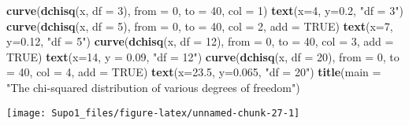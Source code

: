 \documentclass[
]{article}
\newenvironment{Shaded}{\begin{snugshade}}{\end{snugshade}}
\newcommand{\AttributeTok}[1]{\textcolor[rgb]{0.13,0.29,0.53}{#1}}
\newcommand{\ConstantTok}[1]{\textcolor[rgb]{0.56,0.35,0.01}{#1}}
\newcommand{\DecValTok}[1]{\textcolor[rgb]{0.00,0.00,0.81}{#1}}
\newcommand{\FloatTok}[1]{\textcolor[rgb]{0.00,0.00,0.81}{#1}}
\newcommand{\FunctionTok}[1]{\textcolor[rgb]{0.13,0.29,0.53}{\textbf{#1}}}
\newcommand{\NormalTok}[1]{#1}
\newcommand{\StringTok}[1]{\textcolor[rgb]{0.31,0.60,0.02}{#1}}
\begin{document}
\begin{Shaded}
\begin{Highlighting}[]
\FunctionTok{curve}\NormalTok{(}\FunctionTok{dchisq}\NormalTok{(x, }\AttributeTok{df =} \DecValTok{3}\NormalTok{), }\AttributeTok{from =} \DecValTok{0}\NormalTok{, }\AttributeTok{to =} \DecValTok{40}\NormalTok{, }\AttributeTok{col =} \DecValTok{1}\NormalTok{)}
\FunctionTok{text}\NormalTok{(}\AttributeTok{x=}\DecValTok{4}\NormalTok{, }\AttributeTok{y=}\FloatTok{0.2}\NormalTok{, }\StringTok{"df = 3"}\NormalTok{)}
\FunctionTok{curve}\NormalTok{(}\FunctionTok{dchisq}\NormalTok{(x, }\AttributeTok{df =} \DecValTok{5}\NormalTok{), }\AttributeTok{from =} \DecValTok{0}\NormalTok{, }\AttributeTok{to =} \DecValTok{40}\NormalTok{, }\AttributeTok{col =} \DecValTok{2}\NormalTok{, }\AttributeTok{add =} \ConstantTok{TRUE}\NormalTok{)}
\FunctionTok{text}\NormalTok{(}\AttributeTok{x=}\DecValTok{7}\NormalTok{, }\AttributeTok{y=}\FloatTok{0.12}\NormalTok{, }\StringTok{"df = 5"}\NormalTok{)}
\FunctionTok{curve}\NormalTok{(}\FunctionTok{dchisq}\NormalTok{(x, }\AttributeTok{df =} \DecValTok{12}\NormalTok{), }\AttributeTok{from =} \DecValTok{0}\NormalTok{, }\AttributeTok{to =} \DecValTok{40}\NormalTok{, }\AttributeTok{col =} \DecValTok{3}\NormalTok{, }\AttributeTok{add =} \ConstantTok{TRUE}\NormalTok{)}
\FunctionTok{text}\NormalTok{(}\AttributeTok{x=}\DecValTok{14}\NormalTok{, }\AttributeTok{y =} \FloatTok{0.09}\NormalTok{, }\StringTok{"df = 12"}\NormalTok{)}
\FunctionTok{curve}\NormalTok{(}\FunctionTok{dchisq}\NormalTok{(x, }\AttributeTok{df =} \DecValTok{20}\NormalTok{), }\AttributeTok{from =} \DecValTok{0}\NormalTok{, }\AttributeTok{to =} \DecValTok{40}\NormalTok{, }\AttributeTok{col =} \DecValTok{4}\NormalTok{, }\AttributeTok{add =} \ConstantTok{TRUE}\NormalTok{)}
\FunctionTok{text}\NormalTok{(}\AttributeTok{x=}\FloatTok{23.5}\NormalTok{, }\AttributeTok{y=}\FloatTok{0.065}\NormalTok{, }\StringTok{"df = 20"}\NormalTok{)}
\FunctionTok{title}\NormalTok{(}\AttributeTok{main =} \StringTok{"The chi{-}squared distribution of various degrees of freedom"}\NormalTok{)}
\end{Highlighting}
\end{Shaded}

\begin{center}\texttt{[image: Supo1\_files/figure-latex/unnamed-chunk-27-1]} \end{center}
\end{document}
